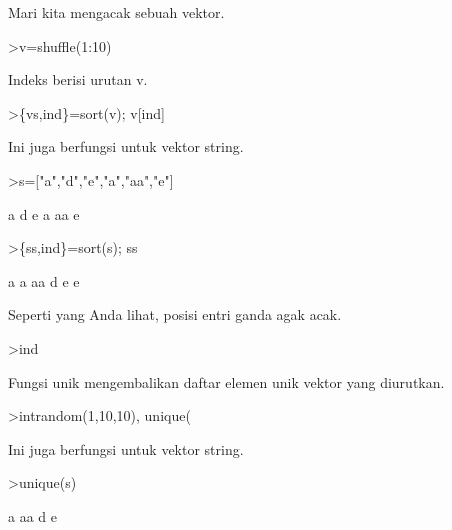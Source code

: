 \begin{eulernotebook}
\begin{eulercomment}
\begin{eulercomment}
\begin{eulercomment}
Mari kita mengacak sebuah vektor.
\end{eulercomment}
\begin{eulerprompt}
>v=shuffle(1:10)
\end{eulerprompt}
\begin{euleroutput}
  [4,  5,  10,  6,  8,  9,  1,  7,  2,  3]
\end{euleroutput}
\begin{eulercomment}
Indeks berisi urutan v.
\end{eulercomment}
\begin{eulerprompt}
>\{vs,ind\}=sort(v); v[ind]
\end{eulerprompt}
\begin{euleroutput}
  [1,  2,  3,  4,  5,  6,  7,  8,  9,  10]
\end{euleroutput}
\begin{eulercomment}
Ini juga berfungsi untuk vektor string.
\end{eulercomment}
\begin{eulerprompt}
>s=["a","d","e","a","aa","e"]
\end{eulerprompt}
\begin{euleroutput}
  a
  d
  e
  a
  aa
  e
\end{euleroutput}
\begin{eulerprompt}
>\{ss,ind\}=sort(s); ss
\end{eulerprompt}
\begin{euleroutput}
  a
  a
  aa
  d
  e
  e
\end{euleroutput}
\begin{eulercomment}
Seperti yang Anda lihat, posisi entri ganda agak acak.
\end{eulercomment}
\begin{eulerprompt}
>ind
\end{eulerprompt}
\begin{euleroutput}
  [4,  1,  5,  2,  6,  3]
\end{euleroutput}
\begin{eulercomment}
Fungsi unik mengembalikan daftar elemen unik vektor yang diurutkan.
\end{eulercomment}
\begin{eulerprompt}
>intrandom(1,10,10), unique(%
\end{eulerprompt}
\begin{euleroutput}
  [4,  4,  9,  2,  6,  5,  10,  6,  5,  1]
  [1,  2,  4,  5,  6,  9,  10]
\end{euleroutput}
\begin{eulercomment}
Ini juga berfungsi untuk vektor string.
\end{eulercomment}
\begin{eulerprompt}
>unique(s)
\end{eulerprompt}
\begin{euleroutput}
  a
  aa
  d
  e\\
  

\end{euleroutput}
\end{eulercomment}
\end{eulercomment}
\end{eulernotebook}
